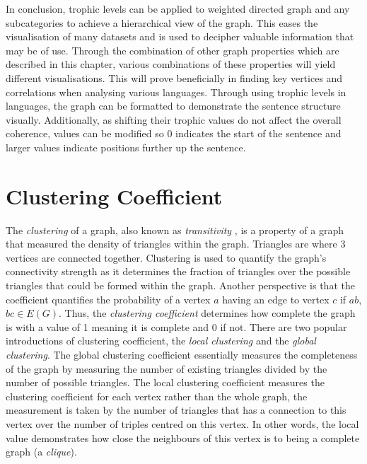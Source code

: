 In conclusion, trophic levels can be applied to weighted directed graph and any subcategories to achieve a hierarchical view of the graph. This eases the visualisation of many datasets and is used to decipher valuable information that may be of use. Through the combination of other graph properties which are described in this chapter, various combinations of these properties will yield different visualisations. This will prove beneficially in finding key vertices and correlations when analysing various languages. Through using trophic levels in languages, the graph can be formatted to demonstrate the sentence structure visually. Additionally, as shifting their trophic values do not affect the overall coherence, values can be modified so 0 indicates the start of the sentence and larger values indicate positions further up the sentence.

\section{Clustering Coefficient}
The \emph{clustering} of a graph, also known as \emph{transitivity} \cite{schank2005approximating}, is a property of a graph that measured the density of triangles within the graph. Triangles are where 3 vertices are connected together. Clustering is used to quantify the graph's connectivity strength as it determines the fraction of triangles over the possible triangles that could be formed within the graph. Another perspective is that the coefficient quantifies the probability of a vertex $a$ having an edge to vertex $c$ if $ab$, $bc \in E(G)$. Thus, the \emph{clustering coefficient} determines how complete the graph is with a value of 1 meaning it is complete and 0 if not. There are two popular introductions of clustering coefficient, the \emph{local clustering} and the \emph{global clustering}. The global clustering coefficient essentially measures the completeness of the graph by measuring the number of existing triangles divided by the number of possible triangles. The local clustering coefficient measures the clustering coefficient for each vertex rather than the whole graph, the measurement is taken by the number of triangles that has a connection to this vertex over the number of triples centred on this vertex. In other words, the local value demonstrates how close the neighbours of this vertex is to being a complete graph (a \emph{clique}).

